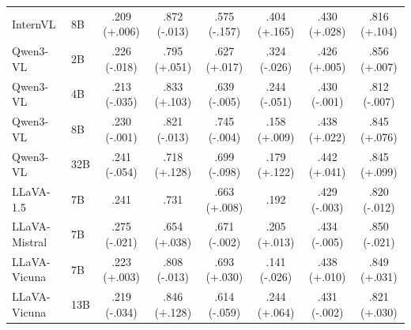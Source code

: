 \begin{table}[h]
{\begin{tabular}{ll@{\hspace{2pt}}cc@{\hspace{6pt}}cc@{\hspace{6pt}}cc}
InternVL & 8B & .209 {(\textcolor[HTML]{CC7A00}{+.006})} & .872 {(\textcolor[HTML]{0072B2}{-.013})} & .575 {(\textcolor[HTML]{0072B2}{-.157})} & .404 {(\textcolor[HTML]{CC7A00}{+.165})} & .430 {(\textcolor[HTML]{CC7A00}{+.028})} & .816 {(\textcolor[HTML]{CC7A00}{+.104})} \\
Qwen3-VL & 2B & .226 {(\textcolor[HTML]{0072B2}{-.018})} & .795 {(\textcolor[HTML]{CC7A00}{+.051})} & .627 {(\textcolor[HTML]{CC7A00}{+.017})} & .324 {(\textcolor[HTML]{0072B2}{-.026})} & .426 {(\textcolor[HTML]{CC7A00}{+.005})} & .856 {(\textcolor[HTML]{CC7A00}{+.007})} \\
Qwen3-VL & 4B & .213 {(\textcolor[HTML]{0072B2}{-.035})} & .833 {(\textcolor[HTML]{CC7A00}{+.103})} & .639 {(\textcolor[HTML]{0072B2}{-.005})} & .244 {(\textcolor[HTML]{0072B2}{-.051})} & .430 {(\textcolor[HTML]{0072B2}{-.001})} & .812 {(\textcolor[HTML]{0072B2}{-.007})} \\
Qwen3-VL & 8B & .230 {(\textcolor[HTML]{0072B2}{-.001})} & .821 {(\textcolor[HTML]{0072B2}{-.013})} & .745 {(\textcolor[HTML]{0072B2}{-.004})} & .158 {(\textcolor[HTML]{CC7A00}{+.009})} & .438 {(\textcolor[HTML]{CC7A00}{+.022})} & .845 {(\textcolor[HTML]{CC7A00}{+.076})} \\
Qwen3-VL & 32B & .241 {(\textcolor[HTML]{0072B2}{-.054})} & .718 {(\textcolor[HTML]{CC7A00}{+.128})} & .699 {(\textcolor[HTML]{0072B2}{-.098})} & .179 {(\textcolor[HTML]{CC7A00}{+.122})} & .442 {(\textcolor[HTML]{CC7A00}{+.041})} & .845 {(\textcolor[HTML]{CC7A00}{+.099})} \\
LLaVA-1.5 & 7B & .241 & .731 & .663 {(\textcolor[HTML]{CC7A00}{+.008})} & .192 & .429 {(\textcolor[HTML]{0072B2}{-.003})} & .820 {(\textcolor[HTML]{0072B2}{-.012})} \\
LLaVA-Mistral & 7B & .275 {(\textcolor[HTML]{0072B2}{-.021})} & .654 {(\textcolor[HTML]{CC7A00}{+.038})} & .671 {(\textcolor[HTML]{0072B2}{-.002})} & .205 {(\textcolor[HTML]{CC7A00}{+.013})} & .434 {(\textcolor[HTML]{0072B2}{-.005})} & .850 {(\textcolor[HTML]{0072B2}{-.021})} \\
LLaVA-Vicuna & 7B & .223 {(\textcolor[HTML]{CC7A00}{+.003})} & .808 {(\textcolor[HTML]{0072B2}{-.013})} & .693 {(\textcolor[HTML]{CC7A00}{+.030})} & .141 {(\textcolor[HTML]{0072B2}{-.026})} & .438 {(\textcolor[HTML]{CC7A00}{+.010})} & .849 {(\textcolor[HTML]{CC7A00}{+.031})} \\
LLaVA-Vicuna & 13B & .219 {(\textcolor[HTML]{0072B2}{-.034})} & .846 {(\textcolor[HTML]{CC7A00}{+.128})} & .614 {(\textcolor[HTML]{0072B2}{-.059})} & .244 {(\textcolor[HTML]{CC7A00}{+.064})} & .431 {(\textcolor[HTML]{0072B2}{-.002})} & .821 {(\textcolor[HTML]{CC7A00}{+.030})} \\

\end{tabular}}
\end{table}
